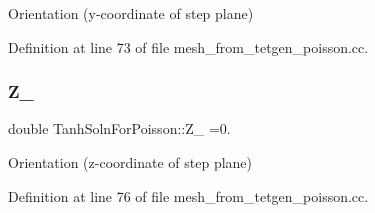 Orientation (y-\/coordinate of step plane) 



Definition at line 73 of file mesh\+\_\+from\+\_\+tetgen\+\_\+poisson.\+cc.

\mbox{\label{namespaceTanhSolnForPoisson_abf4856ed1855c34c2b2ea57fd6783644}} 
\subsubsection{\texorpdfstring{Z\+\_}{Z\_0}}
{\footnotesize\ttfamily double Tanh\+Soln\+For\+Poisson\+::\+Z\+\_ =0.}



Orientation (z-\/coordinate of step plane) 



Definition at line 76 of file mesh\+\_\+from\+\_\+tetgen\+\_\+poisson.\+cc.


